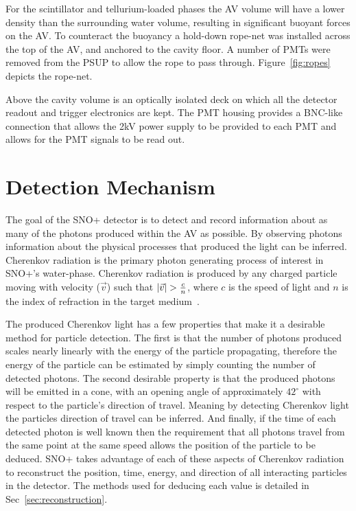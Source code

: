 For the scintillator and tellurium-loaded phases the AV volume will have
a lower density than the surrounding water volume, resulting in significant buoyant
forces on the AV\@.
To counteract the buoyancy a hold-down rope-net was installed across the top
of the AV, and anchored to the cavity floor.
A number of PMTs were removed from the PSUP to allow the rope to pass through.
Figure~\ref{fig:ropes} depicts the rope-net.

Above the cavity volume is an optically isolated deck on which all the detector
readout and trigger electronics are kept.
The PMT housing provides a BNC-like connection that allows the 2kV power 
supply to be provided to each PMT and allows for the PMT signals to be read
out.

\section{Detection Mechanism}
The goal of the SNO+ detector is to detect and record information about as
many of the photons produced within the AV as possible.
By observing photons information about the physical processes that produced
the light can be inferred.
Cherenkov radiation is the primary photon generating process of interest in
SNO+'s water-phase.
Cherenkov radiation is produced by any charged particle moving with
velocity ($\vec{v}$) such that $\abs{\vec{v}} > \frac{c}{n}$, where $c$ is the speed
of light and $n$ is the index of refraction in the target medium~\citep{cherenkov}.

The produced Cherenkov light has a few properties that make it a desirable
method for particle detection.
The first is that the number of photons produced scales nearly linearly
with the energy of the particle propagating, therefore the energy of the particle
can be estimated by simply counting the number of detected photons.
The second desirable property is that the produced photons will be
emitted in a cone, with an opening angle of approximately $42^{\circ}$ with
respect to the particle's direction of travel.
Meaning by detecting Cherenkov light the particles direction of travel
can be inferred.
And finally, if the time of each detected photon is well known then
the requirement that all photons travel from the same point at the same speed
allows the position of the particle to be deduced.
SNO+ takes advantage of each of these aspects of Cherenkov radiation to reconstruct
the position, time, energy, and direction of all interacting particles in the
detector.
The methods used for deducing each value is detailed in Sec~\ref{sec:reconstruction}.

